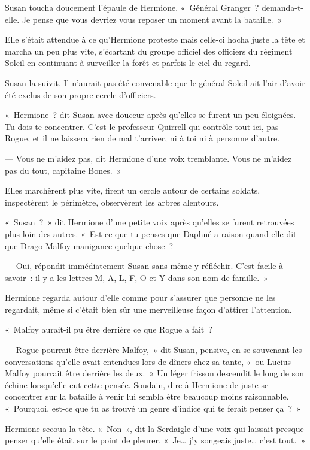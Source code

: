 Susan toucha doucement l'épaule de Hermione.
«~Général Granger~? demanda-t-elle.
Je pense que vous devriez vous reposer un moment avant la bataille.~»

Elle s'était attendue à ce qu'Hermione proteste mais celle-ci hocha juste la tête et marcha un peu plus vite, s'écartant du groupe officiel des officiers du régiment Soleil en continuant à surveiller la forêt et parfois le ciel du regard.

Susan la suivit.
Il n'aurait pas été convenable que le général Soleil ait l'air d'avoir été exclus de son propre cercle d'officiers.

«~Hermione~? dit Susan avec douceur après qu'elles se furent un peu éloignées.
Tu dois te concentrer.
C'est le professeur Quirrell qui contrôle tout ici, pas Rogue, et il ne laissera rien de mal t'arriver, ni à toi ni à personne d'autre.

--- Vous ne m'aidez pas, dit Hermione d'une voix tremblante.
Vous ne m'aidez pas du tout, capitaine Bones.~»

Elles marchèrent plus vite, firent un cercle autour de certains soldats, inspectèrent le périmètre, observèrent les arbres alentours.

«~Susan~?~»
dit Hermione d'une petite voix après qu'elles se furent retrouvées plus loin des autres.
«~Est-ce que tu penses que Daphné a raison quand elle dit que Drago Malfoy manigance quelque chose~?

--- Oui, répondit immédiatement Susan sans même y réfléchir.
C'est facile à savoir~: il y a les lettres M, A, L, F, O et Y dans son nom de famille.~»

Hermione regarda autour d'elle comme pour s'assurer que personne ne les regardait, même si c'était bien sûr une merveilleuse façon d'attirer l'attention.

«~Malfoy aurait-il pu être derrière ce que Rogue a fait~?

--- Rogue pourrait être derrière Malfoy,~» dit Susan, pensive, en se souvenant les conversations qu'elle avait entendues lors de dîners chez sa tante, «~ou Lucius Malfoy pourrait être derrière les deux.~»
Un léger frisson descendit le long de son échine lorsqu'elle eut cette pensée.
Soudain, dire à Hermione de juste se concentrer sur la bataille à venir lui sembla être beaucoup moins raisonnable.
«~Pourquoi, est-ce que tu as trouvé un genre d'indice qui te ferait penser ça~?~»

Hermione secoua la tête.
«~Non~», dit la Serdaigle d'une voix qui laissait presque penser qu'elle était sur le point de pleurer.
«~Je… j'y songeais juste… c'est tout.~»

